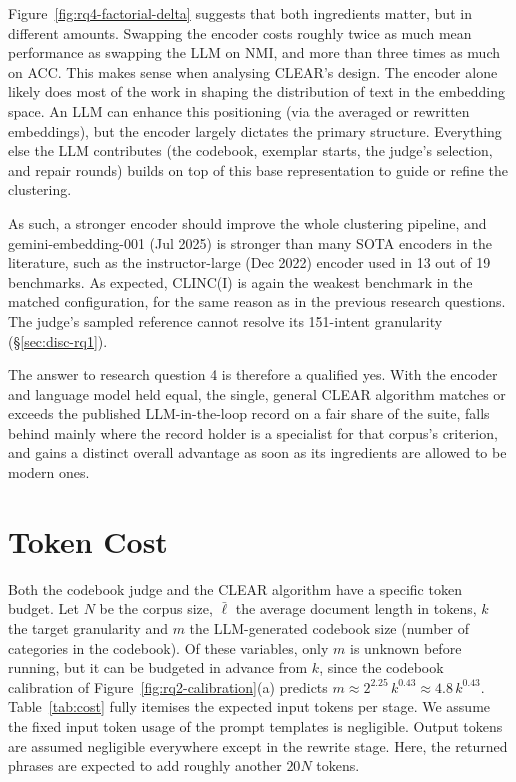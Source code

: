 \documentclass[11pt,a4paper,oneside]{report}
\begin{document}
Figure~\ref{fig:rq4-factorial-delta} suggests that both ingredients matter, but in different amounts. Swapping the encoder costs roughly twice as much mean performance as swapping the LLM on NMI, and more than three times as much on ACC. This makes sense when analysing CLEAR's design. The encoder alone likely does most of the work in shaping the distribution of text in the embedding space. An LLM can enhance this positioning (via the averaged or rewritten embeddings), but the encoder largely dictates the primary structure. Everything else the LLM contributes (the codebook, exemplar starts, the judge's selection, and repair rounds) builds on top of this base representation to guide or refine the clustering.

As such, a stronger encoder should improve the whole clustering pipeline, and {\small\ttfamily gemini-embedding-001} (Jul 2025) is stronger than many SOTA encoders in the literature, such as the {\small\ttfamily instructor-large} (Dec 2022) encoder used in 13 out of 19 benchmarks. As expected, CLINC(I) is again the weakest benchmark in the matched configuration, for the same reason as in the previous research questions. The judge's sampled reference cannot resolve its 151-intent granularity (\S\ref{sec:disc-rq1}).

The answer to research question 4 is therefore a qualified yes. With the encoder and language model held equal, the single, general CLEAR algorithm matches or exceeds the published LLM-in-the-loop record on a fair share of the suite, falls behind mainly where the record holder is a specialist for that corpus's criterion, and gains a distinct overall advantage as soon as its ingredients are allowed to be modern ones.

\section{Token Cost}\label{sec:cost}

Both the codebook judge and the CLEAR algorithm have a specific token budget. Let $N$ be the corpus size, $\bar{\ell}$ the average document length in tokens, $k$ the target granularity and $m$ the LLM-generated codebook size (number of categories in the codebook). Of these variables, only $m$ is unknown before running, but it can be budgeted in advance from $k$, since the codebook calibration of Figure~\ref{fig:rq2-calibration}(a) predicts $m \approx 2^{2.25}\,k^{0.43} \approx 4.8\,k^{0.43}$. Table~\ref{tab:cost} fully itemises the expected input tokens per stage. We assume the fixed input token usage of the prompt templates is negligible. Output tokens are assumed negligible everywhere except in the rewrite stage. Here, the returned phrases are expected to add roughly another $20N$ tokens.
\end{document}
